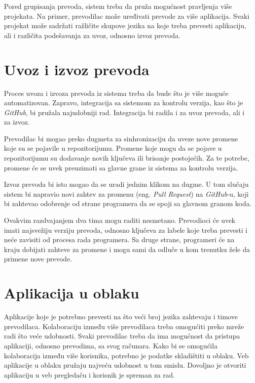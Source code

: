 Pored grupisanja prevoda, sistem treba da pruža mogućnost pravljenja više projekata. Na primer, prevodilac 
može uređivati prevode za više aplikacija. Svaki projekat može sadržati ražličite skupove jezika na koje 
treba prevesti aplikaciju, ali i različita podešavanja za uvoz, odnosno izvoz prevoda.


\section{Uvoz i izvoz prevoda}\label{sec:funkcionalni_zahtevi-uvoz_izvoz}

Proces uvoza i izvoza prevoda iz sistema treba da bude što je više moguće automatizovan. Zapravo, integracija
sa sistemom za kontrolu verzija, kao što je \textit{GitHub}, bi pružala najudobniji rad. Integracija bi radila i za 
uvoz prevoda, ali i za izvoz. 

Prevodilac bi mogao preko dugmeta za sinhronizaciju da uveze nove promene 
koje su se pojavile u repozitorijumu. Promene koje mogu da se pojave u repozitorijumu su dodavanje novih 
ključeva ili brisanje postojećih. Za te potrebe, promene će se uvek preuzimati sa glavne grane iz sistema za 
kontrolu verzija. 

Izvoz prevoda bi isto mogao da se uradi jednim klikom na dugme. U tom slučaju sistem bi napravio novi zahtev 
za promenu (eng. \textit{Pull Request}) na \textit{GitHub}-u, koji bi zahtevao odobrenje od strane 
programera da se spoji sa glavnom granom koda.

Ovakvim razdvajanjem dva tima mogu raditi nesmetano. Prevodioci će uvek imati najsvežiju verziju prevoda, 
odnosno ključeva za labele koje treba prevesti i neće zavisiti od procesa rada programera. Sa druge strane,
programeri će na kraju dobijati zahteve za promene i mogu sami da odluče u kom trenutku žele da primene nove
prevode.


\section{Aplikacija u oblaku}\label{sec:funkcionalni_zahtevi-aplikacija_u_oblaku}

Aplikacije koje je potrebno prevesti na što veći broj jezika zahtevaju i timove prevodilaca. Kolaboraciju 
između više prevodilaca treba omogućiti preko mreže radi što veće udobnosti. Svaki prevodilac treba da ima 
mogućnost da pristupa aplikaciji, odnosno prevodima, sa svog računara. Kako bi se omogućila kolaboracija 
između više korisnika, potrebno je podatke skladištiti u oblaku. Veb aplikacije u oblaku pružaju najveću 
udobnost u tom smislu. Dovoljno je otvoriti aplikaciju u veb pregledaču i korisnik je spreman za rad.

